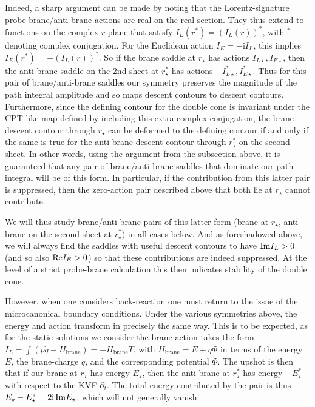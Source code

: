 \documentclass[11pt]{article}
\renewcommand{\i}{\mathrm{i}}
\begin{document}
Indeed, a sharp argument can be made by noting that the Lorentz-signature probe-brane/anti-brane actions are real on the real section.  
They thus extend to functions on the complex $r$-plane that satisfy $I_L(r^*) = \left(I_L(r)\right)^*$, with $^*$ denoting complex conjugation.
For the Euclidean action $I_E = -\i I_L$, this implies $I_E(r^*) = - \left(I_L(r)\right)^*$.  
So if the brane saddle at $r_\star$ has actions $I_{L\star},I_{E\star}$, then the anti-brane saddle on the 2nd sheet at $r_\star^*$ has actions $-I^*_{L\star},I^*_{E\star}$.  
Thus for this pair of brane/anti-brane saddles our symmetry preserves the magnitude of the path integral amplitude and so maps descent contours to descent contours.  
Furthermore, since the defining contour for the double cone is invariant under the CPT-like map defined by including this extra complex conjugation, the brane descent contour through $r_\star$ can be deformed to the defining contour if and only if the same is true for the anti-brane descent contour through $r_\star^*$ on the second sheet.  
In other words, using the argument from the subsection above, it is guaranteed that any pair of brane/anti-brane saddles that dominate our path integral will be of this form.  
In particular, if the contribution from this latter pair is suppressed, then the zero-action pair described above that both lie at $r_\star$ cannot contribute.

We will thus study brane/anti-brane pairs of this latter form (brane at $r_\star$, anti-brane on the second sheet at $r_\star^*$) in all cases below. 
And as foreshadowed above, we will always find the saddles with useful descent contours to have ${\rm Im} I_L >0$ (and so also ${\rm Re} I_E >0$) so that these contributions are indeed suppressed.  
At the level of a strict probe-brane calculation this then indicates stability of the double cone.  

However, when one considers back-reaction one must return to the issue of the microcanonical boundary conditions.  
Under the various symmetries above, the energy and action transform in precisely the same way.  
This is to be expected, as for the static solutions we consider the brane action takes the form $I_L =\int \left( p\dot{q}-H_{\text{brane}} \right) = - H_{\text{brane}}T$, with $H_{\text{brane}} = E +q\Phi$ in terms of the energy $E$, the brane-charge $q$, and the corresponding potential $\Phi$.  
The upshot is then that if our brane at $r_\star$ has energy $E_\star$, then the  anti-brane at $r_\star^*$ has energy $-E_\star^*$ with respect to the KVF $\partial_t$.  The total energy contributed by the pair is thus $E_\star -E_\star^* = 2\i \, {\rm Im} E_\star$, which will not generally vanish.
\end{document}
